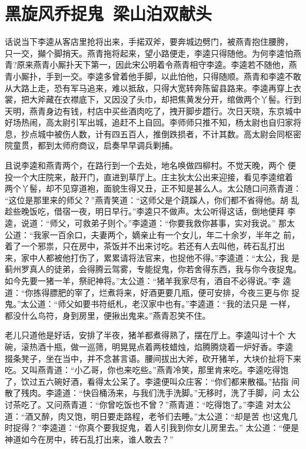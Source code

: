\chapter{黑旋风乔捉鬼~梁山泊双献头}

话说当下李逵从客店里抢将出来，手掿双斧，要奔城边劈门，被燕青抱住腰胯，
只一交，攧个脚捎天。燕青拖将起来，望小路便走，李逵只得随他。为何李逵怕燕
青?原来燕青小厮扑天下第一，因此宋公明着令燕青相守李逵。李逵若不随他，燕
青小厮扑，手到一交。李逵多曾着他手脚，以此怕他，只得随顺。燕青和李逵不敢
从大路上走，恐有军马追来，难以抵敌，只得大宽转奔陈留县路来。李逵再穿上衣
裳，把大斧藏在衣襟底下，又因没了头巾，却把焦黄发分开，绾做两个丫髻。行到
天明，燕青身边有钱，村店中买些酒肉吃了，拽开脚步趱行。次日天晓，东京城中
好场热闹，高太尉引军出城，追赶不上自回。李师师只推不知，杨太尉也自归家将
息，抄点城中被伤人数，计有四五百人，推倒跌损者，不计其数。高太尉会同枢密
院童贯，都到太师府商议，启奏早早调兵剿捕。

且说李逵和燕青两个，在路行到一个去处，地名唤做四柳村。不觉天晚，两个
便投一个大庄院来，敲开门，直进到草厅上。庄主狄太公出来迎接，看见李逵绾着
两个丫髻，却不见穿道袍，面貌生得又丑，正不知是甚么人。太公随口问燕青道：
“这位是那里来的师父？”燕青笑道：“这师父是个跷蹊人，你们都不省得他。胡
乱趁些晚饭吃，借宿一夜，明日早行。”李逵只不做声。太公听得这话，倒地便拜
李逵，说道：“师父，可救弟子则个。”李逵道：“你要我救你甚事，实对我说。”
那太公道：“我家一百余口，夫妻两个，嫡亲止有一个女儿，年二十余岁，半年之
前，着了一个邪祟，只在房中，茶饭并不出来讨吃。若还有人去叫他，砖石乱打出
来，家中人都被他打伤了，累累请将法官来，也捉他不得。”李逵道：“太公，我
是蓟州罗真人的徒弟，会得腾云驾雾，专能捉鬼，你若舍得东西，我与你今夜捉鬼。
如今先要一猪一羊，祭祀神将。”太公道：“猪羊我家尽有，酒自不必得说。”李
逵道：“你拣得膘肥的宰了，烂煮将来，好酒更要几瓶，便可安排，今夜三更与你
捉鬼。”太公道：“师父如要书符纸札，老汉家中也有。”李逵道：“我的法只是
一样，都没什么鸟符，身到房里，便揪出鬼来。”燕青忍笑不住。

老儿只道他是好话，安排了半夜，猪羊都煮得熟了，摆在厅上。李逵叫讨十个
大碗，滚热酒十瓶，做一巡筛，明晃晃点着两枝蜡烛，焰腾腾烧着一炉好香。李逵
掇条凳子，坐在当中，并不念甚言语。腰间拔出大斧，砍开猪羊，大块价扯将下来
吃。又叫燕青道：“小乙哥，你也来吃些。”燕青冷笑，那里肯来吃。李逵吃得饱
了，饮过五六碗好酒，看得太公呆了。李逵便叫众庄客：“你们都来散福。”拈指
间散了残肉。李逵道：“快舀桶汤来，与我们洗手洗脚。”无移时，洗了手脚，问
太公讨茶吃了。又问燕青道：“你曾吃饭也不曾？”燕青道：“吃得饱了。”李逵
对太公道：“酒又醉，肉又饱，明日要走路程，老爷们去睡。”太公道：“却是苦
也!这鬼几时捉得？”李逵道：“你真个要我捉鬼，着人引我到你女儿房里去。”
太公道：“便是神道如今在房中，砖石乱打出来，谁人敢去？”

